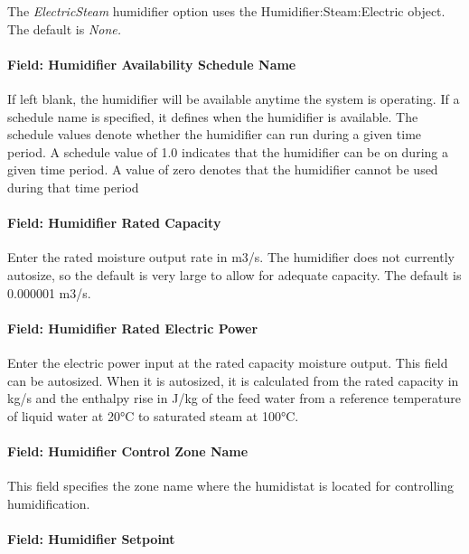 The \emph{ElectricSteam} humidifier option uses the Humidifier:Steam:Electric object. The default is \emph{None.}

\paragraph{Field: Humidifier Availability Schedule Name}\label{field-humidifier-availability-schedule-name-1}

If left blank, the humidifier will be available anytime the system is operating. If a schedule name is specified, it defines when the humidifier is available. The schedule values denote whether the humidifier can run during a given time period. A schedule value of 1.0 indicates that the humidifier can be on during a given time period. A value of zero denotes that the humidifier cannot be used during that time period

\paragraph{Field: Humidifier Rated Capacity}\label{field-humidifier-rated-capacity-1}

Enter the rated moisture output rate in m3/s. The humidifier does not currently autosize, so the default is very large to allow for adequate capacity. The default is 0.000001 m3/s.

\paragraph{Field: Humidifier Rated Electric Power}\label{field-humidifier-rated-electric-power-1}

Enter the electric power input at the rated capacity moisture output. This field can be autosized. When it is autosized, it is calculated from the rated capacity in kg/s and the enthalpy rise in J/kg of the feed water from a reference temperature of liquid water at 20°C to saturated steam at 100°C.

\paragraph{Field: Humidifier Control Zone Name}\label{field-humidifier-control-zone-name-1}

This field specifies the zone name where the humidistat is located for controlling humidification.

\paragraph{Field: Humidifier Setpoint}\label{field-humidifier-setpoint-1}

